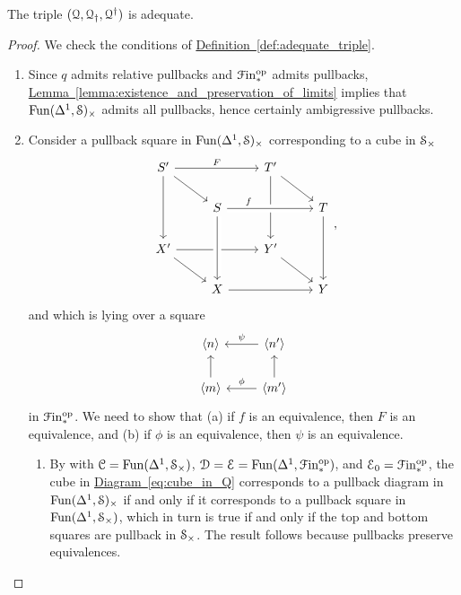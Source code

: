 \documentclass[main.tex]{subfiles}
\begin{document}
\begin{lemma}
  The triple $\triple{Q}$ is adequate.
\end{lemma}
\begin{proof}
  We check the conditions of \hyperref[def:adequate_triple]{Definition~\ref*{def:adequate_triple}}.
  \begin{enumerate}
    \item Since $q$ admits relative pullbacks and $\Finp\op$ admits pullbacks, \hyperref[lemma:existence_and_preservation_of_limits]{Lemma~\ref*{lemma:existence_and_preservation_of_limits}} implies that $\Fun(\Delta^{1}, \S)_{\times}$ admits all pullbacks, hence certainly ambigressive pullbacks. 
          
    \item Consider a pullback square in $\Fun(\Delta^{1}, \S)_{\times}$ corresponding to a cube in $\S_{\times}$
      \begin{equation}
        \label{eq:cube_in_Q}
        \begin{tikzcd}
          S'
          \arrow[rr, "F"]
          \arrow[dd]
          \arrow[dr]
          && T'
          \arrow[dd]
          \arrow[dr]
          \\
          & S
          \arrow[rr, crossing over, near start, "f"]
          && T
          \arrow[dd]
          \\
          X'
          \arrow[dr]
          \arrow[rr]
          && Y'
          \arrow[dr]
          \\
          & X
          \arrow[from=uu, crossing over]
          \arrow[rr]
          && Y
        \end{tikzcd},
      \end{equation}
      and which is lying over a square
      \begin{equation}
        \label{eq:square_in_finp_under_Q}
        \begin{tikzcd}
          \langle n \rangle
          & \langle n' \rangle
          \arrow[l, swap, "\psi"]
          \\
          \langle m \rangle
          \arrow[u]
          & \langle m' \rangle
          \arrow[l, swap, "\phi"]
          \arrow[u]
        \end{tikzcd}
      \end{equation}
      in $\Finp\op$. We need to show that (a) if $f$ is an equivalence, then $F$ is an equivalence, and (b) if $\phi$ is an equivalence, then $\psi$ is an equivalence.
      \begin{enumerate}
        \item By \cite[Cor.\ 4.3.1.15]{highertopostheory} with $\category{C} = \Fun(\Delta^{1}, \S_{\times})$, $\category{D} = \category{E} = \Fun(\Delta^{1}, \Finp\op)$, and $\category{E}_{0} = \Finp\op$, the cube in \hyperref[eq:cube_in_Q]{Diagram~\ref*{eq:cube_in_Q}} corresponds to a pullback diagram in $\Fun(\Delta^{1}, \S)_{\times}$ if and only if it corresponds to a pullback square in $\Fun(\Delta^{1}, \S_{\times})$, which in turn is true if and only if the top and bottom squares are pullback in $\S_{\times}$. The result follows because pullbacks preserve equivalences.


\end{enumerate}
\end{enumerate}
\end{proof}
\end{document}
